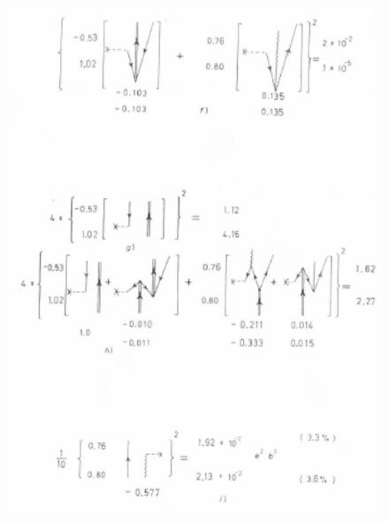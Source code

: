               \begin{figure}
              \centerline {
              \includegraphics*[width=12cm]{introduccion/figs/fig24b}
              }
              \end{figure}
